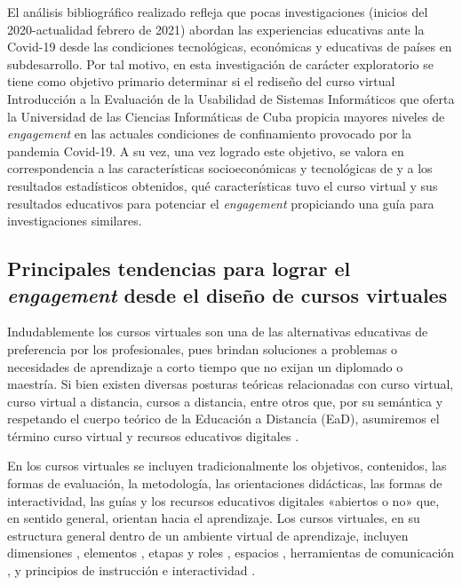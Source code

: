 \documentclass[spanish]{textolivre}
\begin{document}
El análisis bibliográfico realizado refleja que pocas investigaciones (inicios del 2020-actualidad febrero de 2021) abordan las experiencias educativas ante la Covid-19 desde las condiciones tecnológicas, económicas y educativas de países en subdesarrollo. Por tal motivo, en esta investigación de carácter exploratorio se tiene como objetivo primario determinar si el rediseño del curso virtual Introducción a la Evaluación de la Usabilidad de Sistemas Informáticos que oferta la Universidad de las Ciencias Informáticas de Cuba propicia mayores niveles de \emph{engagement} en las actuales condiciones de confinamiento provocado por la pandemia Covid-19.  A su vez, una vez logrado este objetivo, se valora en correspondencia a las características socioeconómicas y tecnológicas de y a los resultados estadísticos obtenidos, qué características tuvo el curso virtual y sus resultados educativos para potenciar el \emph{engagement} propiciando una guía para investigaciones similares.

\subsection{Principales tendencias para lograr el \emph{engagement} desde el diseño de cursos virtuales}
Indudablemente los cursos virtuales son una de las alternativas educativas de preferencia por los profesionales, pues brindan soluciones a problemas o necesidades de aprendizaje a corto tiempo que no exijan un diplomado o maestría. Si bien existen diversas posturas teóricas relacionadas con curso virtual, curso virtual a distancia, cursos a distancia, entre otros que, por su semántica y respetando el cuerpo teórico de la Educación a Distancia (EaD), asumiremos el término curso virtual y recursos educativos digitales \cite{garciaaretio2020}. %

En los cursos virtuales se incluyen tradicionalmente los objetivos, contenidos, las formas de evaluación, la metodología, las orientaciones didácticas, las formas de interactividad, las guías y los recursos educativos digitales «abiertos o no» que, en sentido general, orientan hacia el aprendizaje. Los cursos virtuales, en su estructura general dentro de un ambiente virtual de aprendizaje, incluyen dimensiones \cite{coll2008}, %
elementos \cite{valenciavallejo2014}, %
etapas y roles \cite{perezberenguer2016}, %
espacios \cite{mauri2016}, %
herramientas de comunicación \cite{valenciavallejo2014}, %
y principios de instrucción e interactividad \cite{lin2020}. %
\end{document}
